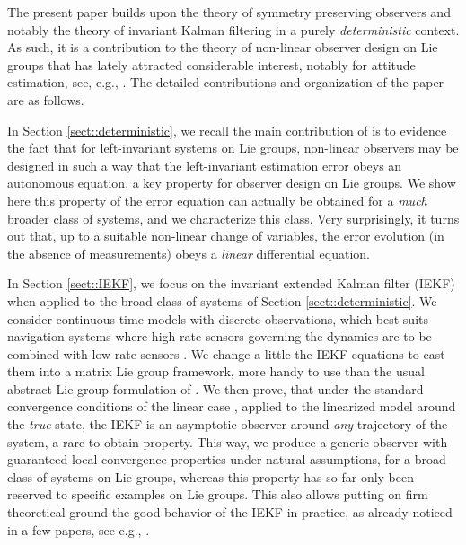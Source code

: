 \documentclass[a4paper,12pt,onecolumn]{article}
\begin{document}
The present paper builds upon the theory of symmetry preserving observers  \cite{bonnabel2008symmetry,bonnabel2009non} and notably the theory of invariant Kalman filtering \cite{bonnabel2007left,bonnabel2009invariant,martin2010generalized,barrau2013intrinsic}  in a purely \emph{deterministic} context. As such, it is a contribution to the theory of non-linear observer design on Lie groups that has lately attracted considerable interest, notably for attitude estimation,  see, e.g.,  \cite{mahony2005complementary,Vasconcelos,barczyk2013invariant,
hua2010attitude,lageman2010gradient,grip2015globally,izadi2014rigid}. The detailed contributions and organization of the paper are as follows.  





 
In Section \ref{sect::deterministic}, we recall the main contribution of \cite{bonnabel2008symmetry,bonnabel2009non} is to evidence the fact that for left-invariant systems on Lie groups, non-linear observers may be designed in such a way that the left-invariant estimation error obeys an autonomous equation, a key property for observer design on Lie groups. We show here this property of the error equation can actually be obtained for a \emph{much} broader class of systems, and we characterize this class. Very surprisingly, it turns out that, up to a suitable non-linear change of variables, the error evolution (in the absence of measurements) obeys a \emph{linear} differential equation.

 
In Section    \ref{sect::IEKF}, we focus on the invariant extended Kalman filter (IEKF) \cite{bonnabel2007left} when applied to the broad class of systems of Section \ref{sect::deterministic}. We consider continuous-time models with discrete observations, which best suits navigation systems where high rate  sensors governing the dynamics are to be combined with low rate sensors \cite{farrell2008aided}. We  change a little the IEKF equations to cast them into a matrix Lie group framework, more handy to use than   the usual abstract Lie group formulation of \cite{bonnabel2007left}. We then prove, that under the standard convergence conditions of the linear case \cite{deyst}, applied to   the linearized model around the \emph{true} state, the IEKF is an asymptotic observer around \emph{any} trajectory of the system, a rare to obtain property. This way, we produce a generic observer with guaranteed local convergence properties under natural assumptions, for a broad class of systems on Lie groups, whereas this property has so far only been reserved to specific examples on Lie groups.   This also allows putting on firm theoretical ground the good behavior of the IEKF in practice, as already noticed in a few papers, see e.g.,  \cite{barczyk2013invariant,barrau2013intrinsic,barczyk2015invariant}. 
\end{document}
